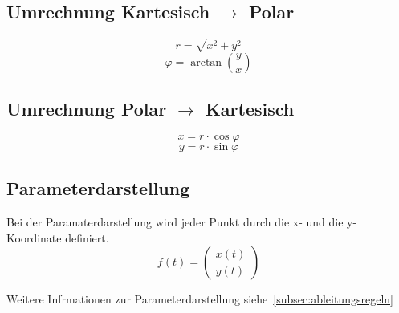 
\subsection{Umrechnung Kartesisch $\rightarrow$ Polar}
\[ \boxed{r = \sqrt{x^2 + y^2}} \]
\[ \boxed{\varphi = \arctan\left(\frac{y}{x}\right)} \]

\subsection{Umrechnung Polar $\rightarrow$ Kartesisch}
\[ \boxed{x = r \cdot \cos{\varphi}} \]
\[ \boxed{y = r \cdot \sin{\varphi}} \]

\subsection{Parameterdarstellung}
Bei der Paramaterdarstellung wird jeder Punkt durch die x- und die y-Koordinate definiert. 
\[ \boxed{f(t) = \left(\begin{matrix} x(t)\\ y(t) \end{matrix}\right)} \] 

\noindent 
Weitere Infrmationen zur Parameterdarstellung siehe~\ref{subsec:ableitungsregeln}
